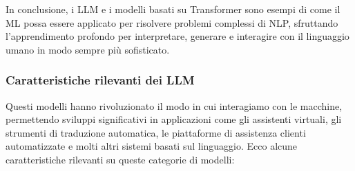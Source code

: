             In conclusione, i LLM e i modelli basati su Transformer sono esempi di come il ML possa essere applicato per risolvere problemi complessi di NLP, sfruttando l'apprendimento profondo per interpretare, generare e interagire con il linguaggio umano in modo sempre più sofisticato. 
        
        \subsubsection{Caratteristiche rilevanti dei LLM}
            Questi modelli hanno rivoluzionato il modo in cui interagiamo con le macchine, permettendo sviluppi significativi in applicazioni come gli assistenti virtuali, gli strumenti di traduzione automatica, le piattaforme di assistenza clienti automatizzate e molti altri sistemi basati sul linguaggio. Ecco alcune caratteristiche rilevanti su queste categorie di modelli:  
